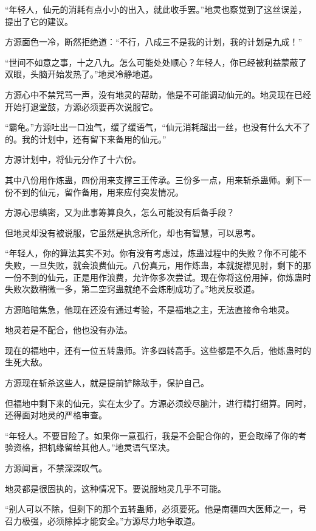 
\begin{this_body}

“年轻人，仙元的消耗有点小小的出入，就此收手罢。”地灵也察觉到了这丝误差，提出了它的建议。

方源面色一冷，断然拒绝道：“不行，八成三不是我的计划，我的计划是九成！”

“世间不如意之事，十之八九。怎么可能处处顺心？年轻人，你已经被利益蒙蔽了双眼，头脑开始发热了。”地灵冷静地道。

方源心中不禁咒骂一声，没有地灵的帮助，他是不可能调动仙元的。地灵现在已经开始打退堂鼓，方源必须要再次说服它。

“霸龟。”方源吐出一口浊气，缓了缓语气，“仙元消耗超出一丝，也没有什么大不了的。我的计划中，还有留下来备用的仙元。”

方源计划中，将仙元分作了十六份。

其中八份用作炼蛊，四份用来支撑三王传承。三份多一点，用来斩杀蛊师。剩下一份不到的仙元，留作备用，用来应付突发情况。

方源心思缜密，又为此事筹算良久，怎么可能没有后备手段？

但地灵却没有被说服，它虽然是执念所化，却也有智慧，可以思考。

“年轻人，你的算法其实不对。你有没有考虑过，炼蛊过程中的失败？你不可能不失败，一旦失败，就会浪费仙元。八份真元，用作炼蛊，本就捉襟见肘，剩下的那一份不到的仙元，正是用作浪费，允许你多次尝试。现在你将这份用掉，你炼蛊时失败次数稍微一多，第二空窍蛊就绝不会炼制成功了。”地灵反驳道。

方源暗暗焦急，他现在还没有通过考验，不是福地之主，无法直接命令地灵。

地灵若是不配合，他也没有办法。

现在的福地中，还有一位五转蛊师。许多四转高手。这些都是不久后，他炼蛊时的生死大敌。

方源现在斩杀这些人，就是提前铲除敌手，保护自己。

但福地中剩下来的仙元，实在太少了。方源必须绞尽脑汁，进行精打细算。同时，还得面对地灵的严格审查。

“年轻人。不要冒险了。如果你一意孤行，我是不会配合你的，更会取缔了你的考验资格，把机缘留给其他人。”地灵语气坚决。

方源闻言，不禁深深叹气。

地灵都是很固执的，这种情况下。要说服地灵几乎不可能。

“别人可以不除，但剩下的那个五转蛊师，必须要死。他是南疆四大医师之一，号召力极强，必须除掉才能安全。”方源尽力地争取道。


\end{this_body}
